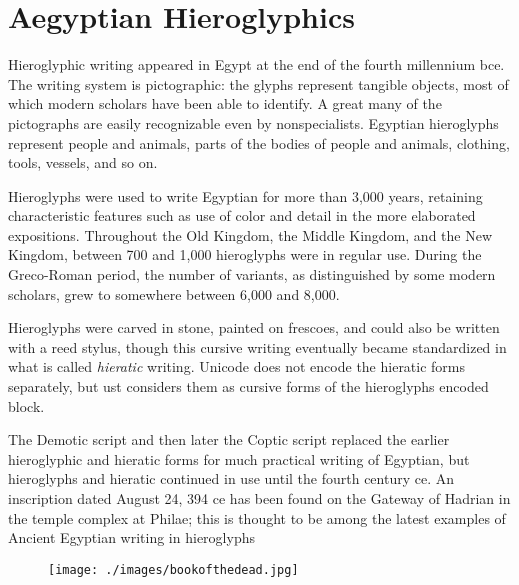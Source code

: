 \newfontfamily{}

\chapter{Aegyptian Hieroglyphics}



\newfontfamily{}

Hieroglyphic writing appeared in Egypt at the end of the fourth millennium bce. The writing
system is pictographic: the glyphs represent tangible objects, most of which modern
scholars have been able to identify. A great many of the pictographs are easily recognizable
even by nonspecialists. Egyptian hieroglyphs represent people and animals, parts of the
bodies of people and animals, clothing, tools, vessels, and so on.

Hieroglyphs were used to write Egyptian for more than 3,000 years, retaining characteristic
features such as use of color and detail in the more elaborated expositions. Throughout the
Old Kingdom, the Middle Kingdom, and the New Kingdom, between 700 and 1,000 hieroglyphs
were in regular use. During the Greco-Roman period, the number of variants, as
distinguished by some modern scholars, grew to somewhere between 6,000 and 8,000.

Hieroglyphs were carved in stone, painted on frescoes, and could also be written with a reed
stylus, though this cursive writing eventually became standardized in what is called \emph{hieratic}
writing. Unicode does not encode the hieratic forms separately, but ust considers them as cursive forms of the hieroglyphs encoded block.

The Demotic script and then later the Coptic script replaced the earlier hieroglyphic and
hieratic forms for much practical writing of Egyptian, but hieroglyphs and hieratic continued
in use until the fourth century ce. An inscription dated August 24, 394 ce has been
found on the Gateway of Hadrian in the temple complex at Philae; this is thought to be
among the latest examples of Ancient Egyptian writing in hieroglyphs

\begin{figure}[htb]
\texttt{[image: ./images/bookofthedead.jpg]}
\end{figure}

